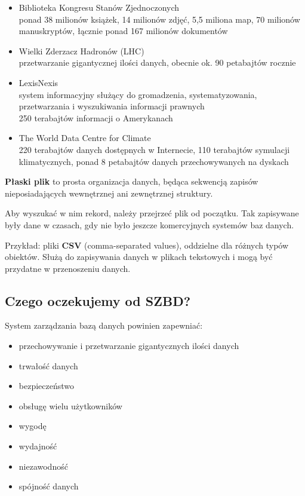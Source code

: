 \begin{itemize}
    \item Biblioteka Kongresu Stanów Zjednoczonych \\
            ponad 38 milionów książek, 14 milionów zdjęć, 5,5 miliona map, 70 milionów manuskryptów, łącznie ponad 167 milionów dokumentów
    \item Wielki Zderzacz Hadronów (LHC) \\
            przetwarzanie gigantycznej ilości danych, obecnie ok. 90 petabajtów rocznie
    \item LexisNexis \\
            system informacyjny służący do gromadzenia, systematyzowania, przetwarzania i wyszukiwania informacji prawnych \\
            250 terabajtów informacji o Amerykanach
    \item The World Data Centre for Climate \\
            220 terabajtów danych dostępnych w Internecie, 110 terabajtów symulacji klimatycznych, ponad 8 petabajtów danych przechowywanych na dyskach
\end{itemize}

\begin{definition}
    \textbf{Płaski plik} to prosta organizacja danych, będąca sekwencją zapisów nieposiadających wewnętrznej ani zewnętrznej struktury.
\end{definition}

Aby wyszukać w nim rekord, należy przejrzeć plik od początku.
Tak zapisywane były dane w czasach, gdy nie było jeszcze komercyjnych systemów baz danych.

Przykład: pliki \textbf{CSV} (comma-separated values), oddzielne dla różnych typów obiektów. Służą do zapisywania danych w plikach tekstowych i mogą być przydatne
w przenoszeniu danych.

\subsection{Czego oczekujemy od SZBD?}

System zarządzania bazą danych powinien zapewniać:
\begin{itemize}
    \item przechowywanie i przetwarzanie gigantycznych ilości danych
    \item trwałość danych
    \item bezpieczeństwo
    \item obsługę wielu użytkowników
    \item wygodę
    \item wydajność
    \item niezawodność
    \item spójność danych
\end{itemize}

